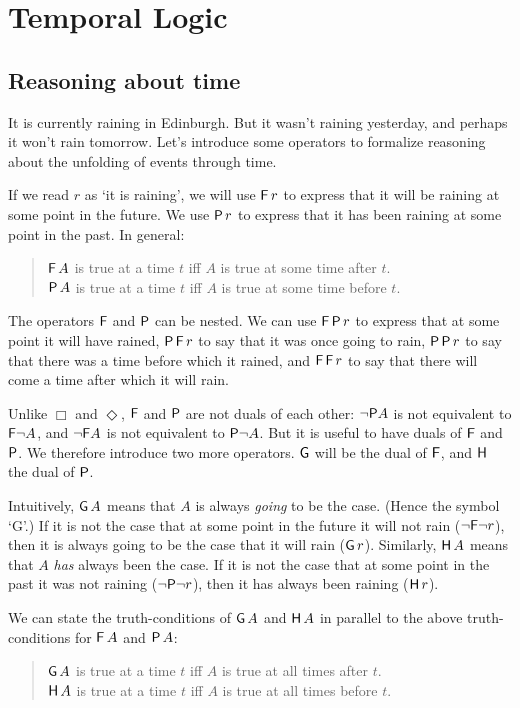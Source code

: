 \chapter{Temporal Logic}\label{ch:time}

\section{Reasoning about time}\label{sec:time-intro}

It is currently raining in Edinburgh. But it wasn't raining yesterday, and
perhaps it won't rain tomorrow. Let's introduce some operators to formalize
reasoning about the unfolding of events through time.

If we read $r$ as `it is raining', we will use $\operatorname{\mathsf{F}} r$ to express that it will be
raining at some point in the future. We use $\operatorname{\mathsf{P}} r$ to express that it has been
raining at some point in the past. In general:
%
\begin{quote}
  $\operatorname{\mathsf{F}} A$ is true at a time $t$ iff $A$ is true at some time after $t$.\\
  $\operatorname{\mathsf{P}} A$ is true at a time $t$ iff $A$ is true at some time before $t$.
\end{quote}

The operators $\operatorname{\mathsf{F}}$ and $\operatorname{\mathsf{P}}$ can be nested. We can use $\operatorname{\mathsf{F}} \operatorname{\mathsf{P}} r$ to express
that at some point it will have rained, $\operatorname{\mathsf{P}}\operatorname{\mathsf{F}} r$ to say that it was once going
to rain, $\operatorname{\mathsf{P}}\operatorname{\mathsf{P}} r$ to say that there was a time before which it rained, and
$\operatorname{\mathsf{F}}\operatorname{\mathsf{F}} r$ to say that there will come a time after which it will rain.

Unlike $\Box$ and $\Diamond$, $\operatorname{\mathsf{F}}$ and $\operatorname{\mathsf{P}}$ are not duals of each other:
$\neg \!\operatorname{\mathsf{P}}\! A$ is not equivalent to $\operatorname{\mathsf{F}} \!\neg A$, and $\neg \!\operatorname{\mathsf{F}}\! A$ is not
equivalent to $\operatorname{\mathsf{P}} \!\neg A$. But it is useful to have duals of $\operatorname{\mathsf{F}}$ and $\operatorname{\mathsf{P}}$.
We therefore introduce two more operators. $\operatorname{\mathsf{G}}$ will be the dual of $\operatorname{\mathsf{F}}$, and
$\operatorname{\mathsf{H}}$ the dual of $\operatorname{\mathsf{P}}$.

Intuitively, $\operatorname{\mathsf{G}} A$ means that $A$ is always \emph{going} to be the case.
(Hence the symbol `G'.) If it is not the case that at some point in the future
it will not rain ($\neg \!\operatorname{\mathsf{F}}\! \neg r$), then it is always going to be the case
that it will rain ($\operatorname{\mathsf{G}} r$). Similarly, $\operatorname{\mathsf{H}} A$ means that $A$ \emph{has} always
been the case. If it is not the case that at some point in the past it was not
raining ($\neg \!\operatorname{\mathsf{P}}\! \neg r$), then it has always been raining ($\operatorname{\mathsf{H}} r$).

We can state the truth-conditions of $\operatorname{\mathsf{G}} A$ and $\operatorname{\mathsf{H}} A$ in parallel to the
above truth-conditions for $\operatorname{\mathsf{F}} A$ and $\operatorname{\mathsf{P}} A$:
\begin{quote}
  $\operatorname{\mathsf{G}} A$ is true at a time $t$ iff $A$ is true at all times after $t$.\\
  $\operatorname{\mathsf{H}} A$ is true at a time $t$ iff $A$ is true at all times before $t$.
\end{quote}

